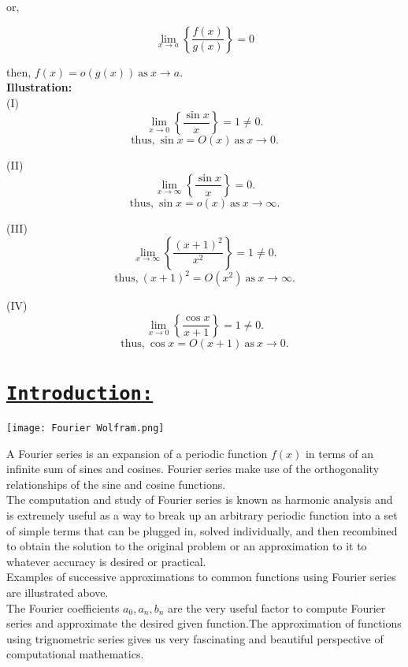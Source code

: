 \documentclass[a4paper,12pt]{article}
\begin{document}
        or, 

        $$\lim_{x\to a}\left\{\frac{f(x)}{g(x)}\right\} = 0$$

        then, $f(x) = o(g(x))\ \mbox{as}\ x\to a.$\\[3mm]

        

        \textbf{Illustration:}\\

        
        (I)\  $$\lim_{x\to 0}\left\{\frac{\sin x}{x}\right\} = 1 \neq 0.$$
        $$\mbox{thus,}\  \sin x = O(x)\ \mbox{as}\ x\to 0.$$

        (II)\  $$\lim_{x\to \infty}\left\{\frac{\sin x}{x}\right\} = 0.$$
        $$\mbox{thus,}\  \sin x = o(x)\ \mbox{as}\ x\to \infty.$$

        (III)\  $$\lim_{x\to \infty}\left\{\frac{(x+1)^2}{x^2}\right\} = 1 \neq 0.$$
        $$\mbox{thus,}\  (x+1)^2 = O(x^2)\ \mbox{as}\ x\to \infty.$$

        (IV)\  $$\lim_{x\to 0}\left\{\frac{\cos x }{x+1}\right\} = 1 \neq 0.$$
        $$\mbox{thus,}\  \cos x = O(x+1)\ \mbox{as}\ x\to 0.$$


        \section*{\underline{\texttt{\textbf {Introduction:}}}}

        \begin{center}
            \texttt{[image: Fourier Wolfram.png]}
        \end{center}

        A Fourier series is an expansion of a periodic function $f(x)$ in terms of an infinite sum of sines and cosines. Fourier series make use of the orthogonality relationships of the sine and cosine functions.\\The computation and study of Fourier series is known as harmonic analysis and is extremely useful as a way to break up an arbitrary periodic function into a set of simple terms that can be plugged in, solved individually, and then recombined to obtain the solution to the original problem or an approximation to it to whatever accuracy is desired or practical.\\
        Examples of successive approximations to common functions using Fourier series are illustrated above.\\

        The Fourier coefficients $a_{0},a_{n}, b_{n}$ are the very useful factor to compute Fourier series and approximate the desired given function.The approximation of functions using trignometric series gives us very fascinating and beautiful perspective of computational mathematics. \\
\end{document}
